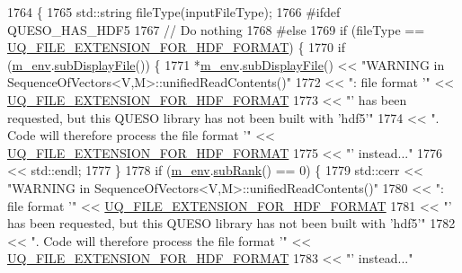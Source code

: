 \begin{DoxyCode}
1764 \{
1765   std::string fileType(inputFileType);
1766 \textcolor{preprocessor}{#ifdef QUESO\_HAS\_HDF5}
1767 \textcolor{preprocessor}{}  \textcolor{comment}{// Do nothing}
1768 \textcolor{preprocessor}{#else}
1769 \textcolor{preprocessor}{}  \textcolor{keywordflow}{if} (fileType == \hyperlink{_defines_8h_a4ebcc075277d031eb97c90b9a45f4493}{UQ\_FILE\_EXTENSION\_FOR\_HDF\_FORMAT}) \{
1770     \textcolor{keywordflow}{if} (\hyperlink{class_q_u_e_s_o_1_1_base_vector_sequence_a8e8824d2a63c5a43bcc6473e3a0491e8}{m\_env}.\hyperlink{class_q_u_e_s_o_1_1_base_environment_a8a0064746ae8dddfece4229b9ad374d6}{subDisplayFile}()) \{
1771       *\hyperlink{class_q_u_e_s_o_1_1_base_vector_sequence_a8e8824d2a63c5a43bcc6473e3a0491e8}{m\_env}.\hyperlink{class_q_u_e_s_o_1_1_base_environment_a8a0064746ae8dddfece4229b9ad374d6}{subDisplayFile}() << \textcolor{stringliteral}{"WARNING in
       SequenceOfVectors<V,M>::unifiedReadContents()"}
1772                               << \textcolor{stringliteral}{": file format '"} << 
      \hyperlink{_defines_8h_a4ebcc075277d031eb97c90b9a45f4493}{UQ\_FILE\_EXTENSION\_FOR\_HDF\_FORMAT}
1773                               << \textcolor{stringliteral}{"' has been requested, but this QUESO library has not been built with
       'hdf5'"}
1774                               << \textcolor{stringliteral}{". Code will therefore process the file format '"} << 
      \hyperlink{_defines_8h_a4ebcc075277d031eb97c90b9a45f4493}{UQ\_FILE\_EXTENSION\_FOR\_HDF\_FORMAT}
1775                               << \textcolor{stringliteral}{"' instead..."}
1776                               << std::endl;
1777     \}
1778     \textcolor{keywordflow}{if} (\hyperlink{class_q_u_e_s_o_1_1_base_vector_sequence_a8e8824d2a63c5a43bcc6473e3a0491e8}{m\_env}.\hyperlink{class_q_u_e_s_o_1_1_base_environment_a172d52f993f1322ed45aaddf71518dbb}{subRank}() == 0) \{
1779       std::cerr << \textcolor{stringliteral}{"WARNING in SequenceOfVectors<V,M>::unifiedReadContents()"}
1780                 << \textcolor{stringliteral}{": file format '"} << \hyperlink{_defines_8h_a4ebcc075277d031eb97c90b9a45f4493}{UQ\_FILE\_EXTENSION\_FOR\_HDF\_FORMAT}
1781                 << \textcolor{stringliteral}{"' has been requested, but this QUESO library has not been built with 'hdf5'"}
1782                 << \textcolor{stringliteral}{". Code will therefore process the file format '"} << 
      \hyperlink{_defines_8h_a4ebcc075277d031eb97c90b9a45f4493}{UQ\_FILE\_EXTENSION\_FOR\_HDF\_FORMAT}
1783                 << \textcolor{stringliteral}{"' instead..."}

\end{DoxyCode}
